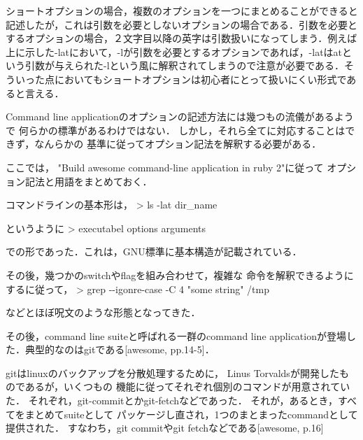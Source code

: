 ショートオプションの場合，複数のオプションを一つにまとめることができると記述したが，これは引数を必要としないオプションの場合である．引数を必要とするオプションの場合，２文字目以降の英字は引数扱いになってしまう．例えば上に示した-latにおいて，-lが引数を必要とするオプションであれば，-latはatという引数が与えられた-lという風に解釈されてしまうので注意が必要である．そういった点においてもショートオプションは初心者にとって扱いにくい形式であると言える．

Command line
applicationのオプションの記述方法には幾つもの流儀があるようで
何らかの標準があるわけではない．
しかし，それら全てに対応することはできず，なんらかの
基準に従ってオプション記法を解釈する必要がある．

ここでは， "Build awesome command-line application in ruby 2"に従って
オプション記法と用語をまとめておく．

コマンドラインの基本形は， \textgreater{} ls -lat dir\_name

というように \textgreater{} executabel options arguments

での形であった．これは，GNU標準に基本構造が記載されている．

その後，幾つかのswitchやflagを組み合わせて，複雑な
命令を解釈できるようにするに従って， \textgreater{} grep -\/-igonre-case
-C 4 "some string" /tmp

などとほぼ呪文のような形態となってきた．

その後，command line suiteと呼ばれる一群のcommand line
applicationが登場した．典型的なのはgitである{[}awesome, pp.14-5{]}．

gitはlinuxのバックアップを分散処理するために， Linus
Torvaldsが開発したものであるが，いくつもの
機能に従ってそれぞれ個別のコマンドが用意されていた．
それぞれ，git-commitとかgit-fetchなどであった．
それが，あるとき，すべてをまとめてsuiteとして
パッケージし直され，1つのまとまったcommandとして提供された．
すなわち，git commitやgit fetchなどである{[}awesome, p.16{]}

    